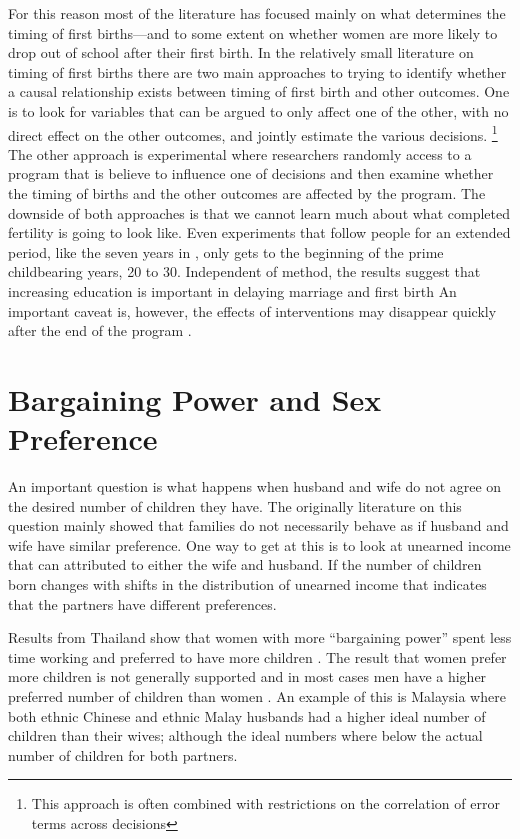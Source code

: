 \documentclass[letterpaper,12pt]{article}
\begin{document}
For this reason most of the literature has focused mainly
on what determines the timing of first births---and to some
extent on whether women are more likely to drop out of
school after their first birth.
In the relatively small literature on timing of first
births there are two main approaches to trying to identify
whether a causal relationship exists between timing of
first birth and other outcomes.
One is to look for variables that can be argued to only
affect one of the other, with no direct effect on the 
other outcomes, and jointly estimate the various decisions.%
\footnote{
This approach is often combined with restrictions on the
correlation of error terms across decisions
}
The other approach is experimental where researchers randomly access
to a program that is believe to influence one of decisions 
and then examine whether the timing of births and the other outcomes 
are affected by the program.
The downside of both approaches is that we cannot learn
much about what completed fertility is going to look like.
Even experiments that follow people for an extended period,
like the seven years in \citet{Duflo2015}, only gets to
the beginning of the prime childbearing years, 20 to 30.
Independent of method, the results suggest that increasing
education is important in delaying marriage and first birth
\citep{Duflo2015,Marchetta2016}
An important caveat is, however, the effects of interventions
may disappear quickly after the end of the program \citep{Baird2016}.


\section{Bargaining Power and Sex Preference}

An important question is what happens when husband and wife do
not agree on the desired number of children they have.
The originally literature on this question mainly showed
that families do not necessarily behave as if husband
and wife have similar preference.
One way to get at this is to look at unearned income that can
attributed to either the wife and husband.
If the number of children born changes with shifts in
the distribution of unearned income that indicates that
the partners have different preferences.

Results from Thailand show that women with more
``bargaining power'' spent less time working
and preferred to have more children \citep{Schultz1990}.
The result that women prefer more children is not generally 
supported and in most cases men have a higher preferred number of 
children than women \citep{Westoff2010}.
An example of this is Malaysia where both ethnic Chinese and
ethnic Malay husbands had a higher ideal number of children
than their wives; although the ideal numbers where below the
actual number of children for both partners\citep{Rasul2008}.
\end{document}
